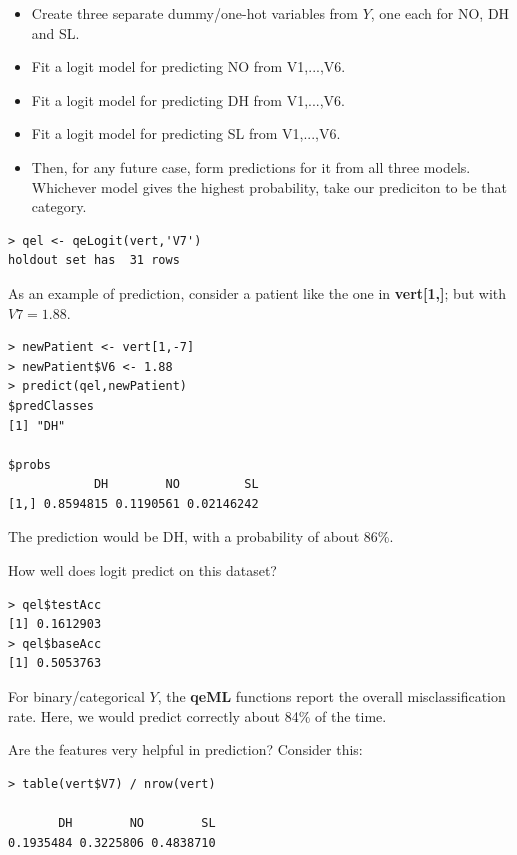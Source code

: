 \begin{itemize}

\item Create three separate dummy/one-hot variables from $Y$, one each
for NO, DH and SL. 

\item Fit a logit model for predicting NO from V1,...,V6.

\item Fit a logit model for predicting DH from V1,...,V6.

\item Fit a logit model for predicting SL from V1,...,V6.

\item Then, for any future case, form predictions for it from all three
models.  Whichever model gives the highest probability, take our
prediciton to be that category.

\end{itemize} 

\begin{lstlisting}
> qel <- qeLogit(vert,'V7')
holdout set has  31 rows
\end{lstlisting}

As an example of prediction, consider a patient like the one in
\textbf{vert[1,]}; but with $V7 = 1.88$.

\begin{lstlisting}
> newPatient <- vert[1,-7]
> newPatient$V6 <- 1.88
> predict(qel,newPatient)
$predClasses
[1] "DH"

$probs
            DH        NO         SL
[1,] 0.8594815 0.1190561 0.02146242
\end{lstlisting}

The prediction would be DH, with a probability of about 86\%.

How well does logit predict on this dataset?

\begin{lstlisting}
> qel$testAcc
[1] 0.1612903
> qel$baseAcc
[1] 0.5053763
\end{lstlisting}


For binary/categorical $Y$, the \textbf{qeML} functions report the
overall misclassification rate.  Here, we would predict correctly about
84\% of the time. 

Are the features very helpful in prediction?  Consider this:

\begin{lstlisting}
> table(vert$V7) / nrow(vert)

       DH        NO        SL 
0.1935484 0.3225806 0.4838710 
\end{lstlisting}

